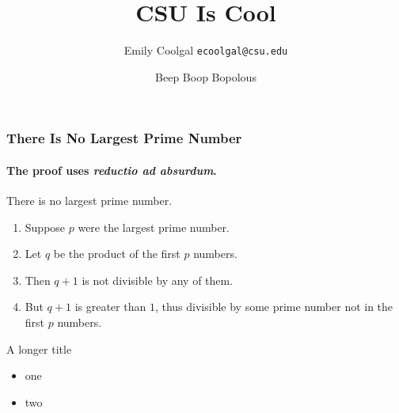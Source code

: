 \documentclass{beamer}
\title{CSU Is Cool}
\date[ISPN ’80]{Beep Boop Bopolous}
\author[Emily]{Emily Coolgal \texttt{ecoolgal@csu.edu}}
\begin{document}
\begin{frame}
\titlepage
\end{frame}

\begin{frame} 
    \frametitle{There Is No Largest Prime Number} 
    \framesubtitle{The proof uses \textit{reductio ad absurdum}.} 
    \begin{theorem}
        There is no largest prime number.
    \end{theorem} 
    \begin{enumerate} 
        \item<1-| alert@1> Suppose $p$ were the largest prime number. 
        \item<2-> Let $q$ be the product of the first $p$ numbers. 
        \item<3-> Then $q+1$ is not divisible by any of them. 
        \item<4-> But $q + 1$ is greater than $1$, thus divisible by some prime
        number not in the first $p$ numbers.
    \end{enumerate}
\end{frame}

\begin{frame}{A longer title}
    \begin{itemize}
        \item one
        \item two
    \end{itemize}
\end{frame}
\end{document}
